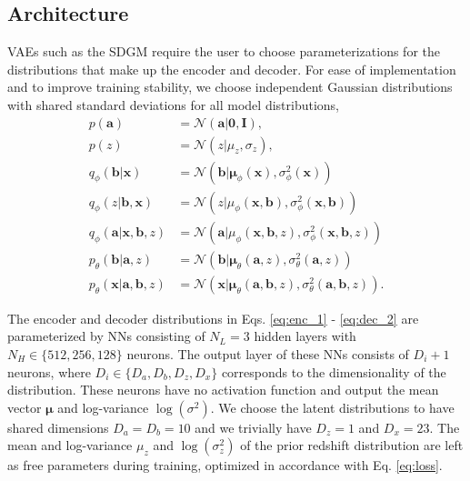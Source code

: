 
\subsection{Architecture}
\label{subsec:architecture}

VAEs such as the SDGM require the user to choose parameterizations for the distributions that make up the encoder and decoder. For ease of implementation and to improve training stability, we choose independent Gaussian distributions with shared standard deviations for all model distributions,
\begin{align}
    p(\mathbf{a}) &= \mathcal{N}(
        \mathbf{a|\mathbf{0}, \mathbf{I}}
    ), \\
    p(z) &= \mathcal{N}(
        z|\mu_z, \sigma_z
    ), \\
    q_\phi(\mathbf{b}|\mathbf{x}) &= \mathcal{N}(
        \mathbf{b}|\boldsymbol{\mu}_\phi(\mathbf{x}), \sigma^2_\phi(\mathbf{x})
    ) \label{eq:enc_1} \\
    q_\phi(z|\mathbf{b},\mathbf{x}) &= \mathcal{N}(
        z|\mu_\phi(\mathbf{x}, \mathbf{b}), \sigma^2_\phi(\mathbf{x}, \mathbf{b})
    )\\
    q_\phi(\mathbf{a} | \mathbf{x}, \mathbf{b}, z) &= \mathcal{N}(
        \mathbf{a}|\mu_\phi(\mathbf{x}, \mathbf{b}, z), \sigma^2_\phi(\mathbf{x}, \mathbf{b}, z)
    )\\
    p_\theta(\mathbf{b}|\mathbf{a}, z) &= \mathcal{N}(
        \mathbf{b}|\boldsymbol{\mu}_\theta(\mathbf{a}, z), \sigma^2_\theta(\mathbf{a}, z)
    ) \\
    p_\theta(\mathbf{x}|\mathbf{a}, \mathbf{b}, z) &= \mathcal{N}(
        \mathbf{x}|\boldsymbol{\mu}_\theta(\mathbf{a}, \mathbf{b}, z), \sigma^2_\theta(\mathbf{a}, \mathbf{b}, z)
    ). \label{eq:dec_2}
\end{align}

The encoder and decoder distributions in Eqs. \ref{eq:enc_1} - \ref{eq:dec_2} are parameterized by NNs consisting of $N_L=3$ hidden layers with $N_H\in \{512, 256, 128\}$ neurons. The output layer of these NNs consists of $D_i+1$ neurons, where $D_i \in \{D_a, D_b, D_z, D_x\}$ corresponds to the dimensionality of the distribution. These neurons have no activation function and output the mean vector $\boldsymbol{\mu}$ and log-variance $\log(\sigma^2)$. We choose the latent distributions to have shared dimensions $D_a = D_b = 10$ and we trivially have $D_z=1$ and $D_x=23$. The mean and log-variance $\mu_z$ and $\log(\sigma_z^2)$ of the prior redshift distribution are left as free parameters during training, optimized in accordance with Eq. \ref{eq:loss}. 

